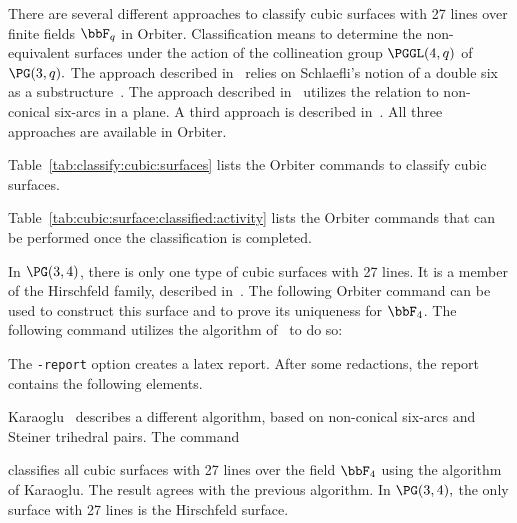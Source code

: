 
There are several different approaches to classify 
cubic surfaces with 27 lines over finite fields $\bbF_q$ in Orbiter.
Classification means to determine the non-equivalent surfaces under the action of the 
collineation group $\PGGL(4,q)$ of $\PG(3,q).$
The approach described in~\cite{BettenKaraoglu19a} 
relies on Schlaefli's notion of 
a double six as a substructure~\cite{Schlaefli58}.
The approach described in~\cite{Karaoglu18} 
utilizes the relation to non-conical six-arcs in a plane.
A third approach is described in~\cite{KaraogluBetten21}.
All three approaches are available in Orbiter.

\bigskip


Table~\ref{tab:classify:cubic:surfaces} 
lists the Orbiter commands to classify cubic surfaces.


\bigskip

Table~\ref{tab:cubic:surface:classified:activity} 
lists the Orbiter commands that can be performed 
once the classification is completed.

\bigskip



In $\PG(3,4)$, there is only one type of cubic surfaces with 27 lines. 
It is a member of the Hirschfeld family, 
described in~\cite{Hirschfeld64}.
The following Orbiter command can be used 
to construct this surface and to prove its uniqueness 
for $\bbF_4$. 
The following command utilizes the algorithm 
of~\cite{BettenKaraoglu19a} to do so:


The \verb'-report' option creates a latex report.
After some redactions, the report contains the following elements.

\bigskip


Karaoglu~\cite{Karaoglu18} describes a different algorithm, 
based on non-conical six-arcs and Steiner trihedral pairs. 
The command 


classifies all cubic surfaces with 27 lines over 
the field $\bbF_{4}$ using the algorithm of Karaoglu.
The result agrees with the previous algorithm. 
In $\PG(3,4),$ the only surface with 27 lines is the Hirschfeld surface.



\bigskip


